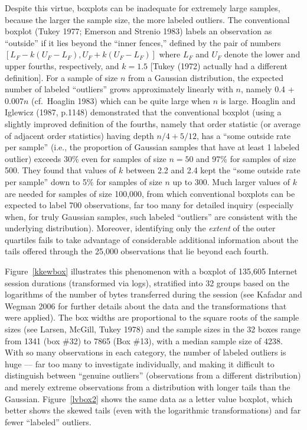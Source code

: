 \documentclass[oneside]{article}
\begin{document}
Despite this virtue, boxplots can be inadequate for 
extremely large samples, because the larger the sample 
size, the more labeled outliers.
The conventional boxplot (Tukey 1977; Emerson and Strenio
1983) labels an observation as ``outside'' if it lies 
beyond the ``inner fences,'' defined by the pair of 
numbers $[L_F - k(U_F - L_F), U_F + k(U_F - L_F)]$ 
where $L_F$ and $U_F$ denote the lower and upper
fourths, respectively, and $k = 1.5$ [Tukey (1972)
actually had a different definition].
For a sample of size $n$ from a Gaussian distribution,
the expected number of labeled ``outliers'' grows 
approximately linearly with $n$, namely 
0.4 + 0.007$n$ 
(cf.~Hoaglin 1983) %
which can be quite large when $n$ is large.  
Hoaglin and Iglewicz (1987, p.1148) demonstrated that the
conventional boxplot (using a slightly improved definition
of the fourths, namely that order statistic (or average of
adjacent order statistics) having depth $n/4 + 5/12$,
has a ``some outside rate per sample'' (i.e., the proportion
of Gaussian samples that have at least 1 labeled outlier) 
exceeds 30\% even for samples of size $n = 50$ and 97\%
for samples of size 500.
They found that values of $k$ between 2.2 and 2.4 kept the
``some outside rate per sample'' down to 5\% for samples
of size $n$ up to 300. 
Much larger values of $k$ are needed for samples of size 
100,000, from which conventional boxplots can be expected to
label 700 observations, far too many for detailed inquiry 
(especially when, for truly Gaussian samples, such labeled 
``outliers'' are consistent with the underlying distribution).
Moreover, identifying only the \textit{extent} of the outer
quartiles fails to take advantage of considerable additional
information about the tails offered through the 25,000 
observations that lie beyond each fourth.

Figure~\ref{kkewbox} illustrates this phenomenon with a boxplot 
of 135,605 Internet session durations (transformed via logs), 
stratified into 32 groups based on the logarithms of the number 
of bytes transferred during the session (see Kafadar and Wegman 2006
for further details about the data and the transformations
that were applied).  The box widths are proportional to the
square roots of the sample sizes (see Larsen, McGill, Tukey
1978) and the sample sizes in the 32 boxes range from 1341
(box \#32) to 7865 (Box \#13), with a median sample size 
of 4238. With so many observations in each category,
the number of labeled outliers is huge --- far too many to
investigate individually, and making it difficult to
distinguish between ``genuine outliers'' (observations
from a different distribution) and merely extreme observations
from a distribution with longer tails than the Gaussian.
Figure~\ref{lvbox2} shows the same data as a letter value boxplot,
which better shows the skewed tails (even with the logarithmic
transformations) and far fewer ``labeled'' outliers.
\end{document}
